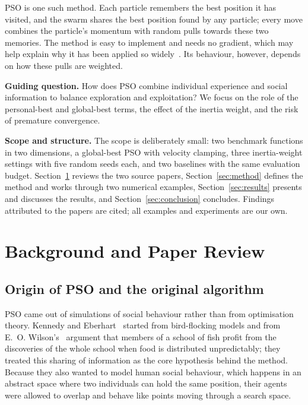 \documentclass[11pt,a4paper]{article}
\begin{document}
PSO is one such method. Each particle remembers the best position it has visited, and the swarm shares the best position found by any particle; every move combines the particle's momentum with random pulls towards these two memories. The method is easy to implement and needs no gradient, which may help explain why it has been applied so widely~\cite[Sect.~6]{poli2007}. Its behaviour, however, depends on how these pulls are weighted.

\textbf{Guiding question.} How does PSO combine individual experience and social information to balance exploration and exploitation? We focus on the role of the personal-best and global-best terms, the effect of the inertia weight, and the risk of premature convergence.

\textbf{Scope and structure.} The scope is deliberately small: two benchmark functions in two dimensions, a global-best PSO with velocity clamping, three inertia-weight settings with five random seeds each, and two baselines with the same evaluation budget. Section~\ref{sec:background} reviews the two source papers, Section~\ref{sec:method} defines the method and works through two numerical examples, Section~\ref{sec:results} presents and discusses the results, and Section~\ref{sec:conclusion} concludes. Findings attributed to the papers are cited; all examples and experiments are our own.

\section{Background and Paper Review}\label{sec:background}

\subsection{Origin of PSO and the original algorithm}
PSO came out of simulations of social behaviour rather than from optimisation theory. Kennedy and Eberhart~\cite[pp.~1942--1943]{kennedy1995} started from bird-flocking models and from E.~O. Wilson's~\cite{wilson1975} argument that members of a school of fish profit from the discoveries of the whole school when food is distributed unpredictably; they treated this sharing of information as the core hypothesis behind the method. Because they also wanted to model human social behaviour, which happens in an abstract space where two individuals can hold the same position, their agents were allowed to overlap and behave like points moving through a search space.
\end{document}
